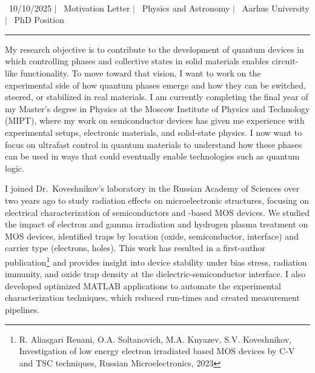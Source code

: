 \documentclass[a4paper,12pt]{article}
\begin{document}
\begin{center}
    {\Huge \scshape {\fontsize{25}{30}\selectfont{Reza}} {\fontsize{25}{30}}} \\ \vspace{3pt}
    {\small \raisebox{-0.2\height}\ {10/10/2025}} $|$
    {\small \raisebox{-0.2\height}\ {Motivation Letter}} $|$
    {\small \raisebox{-0.2\height}\ {Physics and Astronomy}} $|$
    {\small \raisebox{-0.2\height}\ {Aarhus University}} $|$
    {\small \raisebox{-0.2\height}\ {PhD Position}}
    \vspace{-10pt}
\end{center}
\vspace{-10pt}
\noindent\rule{\textwidth}{0.5pt}

My research objective is to contribute to the development of quantum devices in which controlling phases and collective states in solid materials enables circuit-like functionality. To move toward that vision, I want to work on the experimental side of how quantum phases emerge and how they can be switched, steered, or stabilized in real materials. I am currently completing the final year of my Master’s degree in Physics at the Moscow Institute of Physics and Technology (MIPT), where my work on semiconductor devices has given me experience with experimental setups, electronic materials, and solid-state physics. I now want to focus on ultrafast control in quantum materials to understand how these phases can be used in ways that could eventually enable technologies such as quantum logic.

\vspace{10pt}
I joined Dr.\ Koveshnikov's laboratory in the Russian Academy of Sciences over two years ago to study radiation effects on microelectronic structures, focusing on electrical characterization of semiconductors and -based MOS devices. We studied the impact of electron and gamma irradiation and hydrogen plasma treatment on MOS devices, identified traps by location (oxide, semiconductor, interface) and carrier type (electrons, holes). This work has resulted in a first-author publication\footnote{R. Aliasgari Renani, O.A. Soltanovich, M.A. Knyazev, S.V. Koveshnikov, Investigation of low energy electron irradiated  based MOS devices by C-V and TSC techniques, Russian Microelectronics, 2023} and provides insight into device stability under bias stress, radiation immunity, and oxide trap density at the dielectric-semiconductor interface. I also developed optimized MATLAB applications to automate the experimental characterization techniques, which reduced run-times and created measurement pipelines. 
\end{document}
